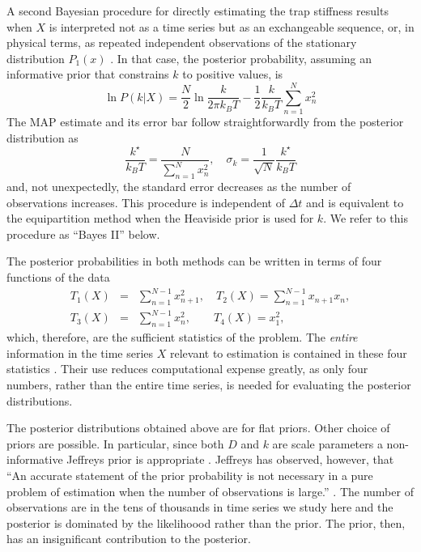 \documentclass[english,aps, twocolumn, pre,superscriptaddress]{revtex4-1}
\begin{document}
A second Bayesian procedure for directly estimating the trap stiffness
results when $X$ is interpreted not as a time series but as an exchangeable
sequence, or, in physical terms, as repeated independent observations
of the stationary distribution $P_{1}(x)$ \cite{jaynes2003probability}.
In that case, the posterior probability, assuming an informative prior
that constrains $k$ to positive values, is
\begin{equation}
\ln P(k|X)=\frac{N}{2}\ln\frac{k}{2\pi k_{B}T}-\frac{1}{2}\frac{k}{k_{B}T}\sum_{n=1}^{N}x_{n}^{2}\label{eq:k-posterior}
\end{equation}
The MAP estimate and its error bar follow straightforwardly from the
posterior distribution as
\begin{equation}
\frac{k^{\star}}{k_{B}T}=\frac{N}{\sum_{n=1}^{N}x_{n}^{2}},\quad\sigma_{k}=\frac{1}{\sqrt{N}}\frac{k^{\star}}{k_{B}T}\label{eq:k-map}
\end{equation}
and, not unexpectedly, the standard error decreases as the number
of observations increases. This procedure is independent of $\Delta t$
and is equivalent to the equipartition method when the Heaviside prior
is used for $k$. We refer to this procedure as ``Bayes II'' below.

The posterior probabilities in both methods can be written in terms
of four functions of the data
\begin{eqnarray}
T_{1}(X) & = & \sum_{n=1}^{N-1}x_{n+1}^{2},\quad T_{2}(X)=\sum_{n=1}^{N-1}x_{n+1}x_{n},\nonumber \\
T_{3}(X) & = & \sum_{n=1}^{N-1}x_{n}^{2},\qquad T_{4}(X)=x_{1}^{2},
\end{eqnarray}
which, therefore, are the sufficient statistics of the problem. The
\emph{entire} information in the time series $X$ relevant to estimation
is contained in these four statistics \cite{jaynes2003probability}.
Their use reduces computational expense greatly, as only four numbers,
rather than the entire time series, is needed for evaluating the posterior
distributions.

The posterior distributions obtained above are for flat priors. Other
choice of priors are possible. In particular, since both $D$ and
$k$ are scale parameters a non-informative Jeffreys prior is appropriate
\cite{jeffreys1998theory}. Jeffreys has observed, however, that ``An
accurate statement of the prior probability is not necessary in a
pure problem of estimation when the number of observations is large.''
\cite{jeffreys1998theory}. The number of observations are in the
tens of thousands in time series we study here and the posterior is
dominated by the likelihoood rather than the prior. The prior, then,
has an insignificant contribution to the posterior. 
\end{document}
